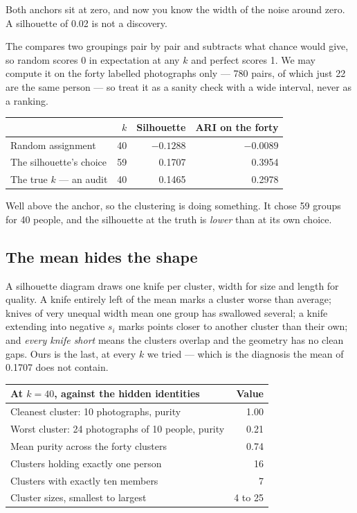 \documentclass[11pt,a4paper]{article}
\begin{document}
Both anchors sit at zero, and now you know the width of the noise around zero.
A silhouette of 0.02 is not a discovery.

The  compares two groupings pair by pair and
subtracts what chance would give, so random scores 0 in expectation at any $k$
and perfect scores 1. We may compute it on the forty labelled photographs
only --- 780 pairs, of which just 22 are the same person --- so treat it as a
sanity check with a wide interval, never as a ranking.

\begin{center}
\small
\begin{tabular}{lrrr}
\toprule
& $k$ & \textbf{Silhouette} & \textbf{ARI on the forty} \\
\midrule
Random assignment      & 40 & $-0.1288$ & $-0.0089$ \\
The silhouette's choice & 59 & 0.1707 & 0.3954 \\
The true $k$ --- an audit & 40 & 0.1465 & 0.2978 \\
\bottomrule
\end{tabular}
\end{center}

Well above the anchor, so the clustering is doing something. It chose 59 groups
for 40 people, and the silhouette at the truth is \emph{lower} than at its own
choice.

\subsection{The mean hides the shape}

A silhouette diagram draws one knife per cluster, width for size and length for
quality. A knife entirely left of the mean marks a cluster worse than average;
knives of very unequal width mean one group has swallowed several; a knife
extending into negative $s_i$ marks points closer to another cluster than their
own; and \emph{every knife short} means the clusters overlap and the geometry
has no clean gaps. Ours is the last, at every $k$ we tried --- which is the
diagnosis the mean of 0.1707 does not contain.

\begin{center}
\small
\begin{tabular}{lr}
\toprule
\textbf{At $k = 40$, against the hidden identities} & \textbf{Value} \\
\midrule
Cleanest cluster: 10 photographs, purity & 1.00 \\
Worst cluster: 24 photographs of 10 people, purity & 0.21 \\
Mean purity across the forty clusters & 0.74 \\
Clusters holding exactly one person & 16 \\
Clusters with exactly ten members & 7 \\
Cluster sizes, smallest to largest & 4 to 25 \\
\bottomrule
\end{tabular}
\end{center}
\end{document}
